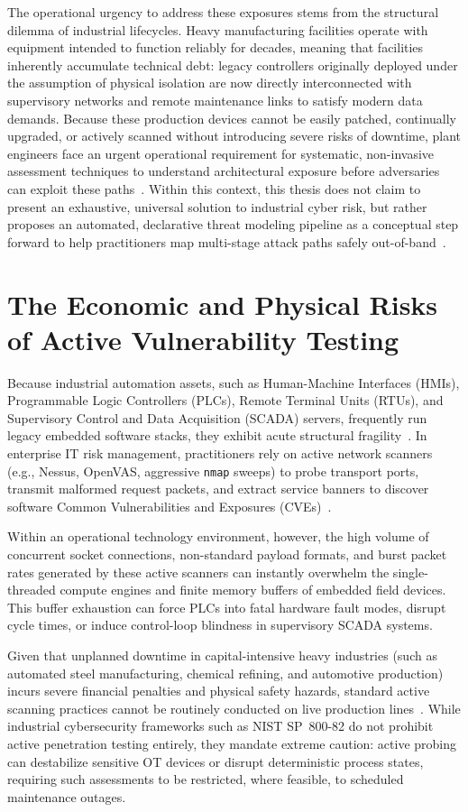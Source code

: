 \documentclass[target=mst,aauheader=aics,style=]{thud}
\begin{document}
The operational urgency to address these exposures stems from the structural dilemma of industrial lifecycles. Heavy manufacturing facilities operate with equipment intended to function reliably for decades, meaning that facilities inherently accumulate technical debt: legacy controllers originally deployed under the assumption of physical isolation are now directly interconnected with supervisory networks and remote maintenance links to satisfy modern data demands. Because these production devices cannot be easily patched, continually upgraded, or actively scanned without introducing severe risks of downtime, plant engineers face an urgent operational requirement for systematic, non-invasive assessment techniques to understand architectural exposure before adversaries can exploit these paths~\cite{SunderOT}. Within this context, this thesis does not claim to present an exhaustive, universal solution to industrial cyber risk, but rather proposes an automated, declarative threat modeling pipeline as a conceptual step forward to help practitioners map multi-stage attack paths safely out-of-band~\cite{Ou05, alviano2025llmasp}.

\section{The Economic and Physical Risks of Active Vulnerability Testing}
Because industrial automation assets, such as Human-Machine Interfaces (HMIs), Programmable Logic Controllers (PLCs), Remote Terminal Units (RTUs), and Supervisory Control and Data Acquisition (SCADA) servers, frequently run legacy embedded software stacks, they exhibit acute structural fragility~\cite{SunderOT}. In enterprise IT risk management, practitioners rely on active network scanners (e.g., Nessus, OpenVAS, aggressive \texttt{nmap} sweeps) to probe transport ports, transmit malformed request packets, and extract service banners to discover software Common Vulnerabilities and Exposures (CVEs)~\cite{Ou05}.

Within an operational technology environment, however, the high volume of concurrent socket connections, non-standard payload formats, and burst packet rates generated by these active scanners can instantly overwhelm the single-threaded compute engines and finite memory buffers of embedded field devices. This buffer exhaustion can force PLCs into fatal hardware fault modes, disrupt cycle times, or induce control-loop blindness in supervisory SCADA systems. 

Given that unplanned downtime in capital-intensive heavy industries (such as automated steel manufacturing, chemical refining, and automotive production) incurs severe financial penalties and physical safety hazards, standard active scanning practices cannot be routinely conducted on live production lines~\cite{tayouri2023survey}. While industrial cybersecurity frameworks such as NIST SP~800-82 do not prohibit active penetration testing entirely, they mandate extreme caution: active probing can destabilize sensitive OT devices or disrupt deterministic process states, requiring such assessments to be restricted, where feasible, to scheduled maintenance outages. 
\end{document}
